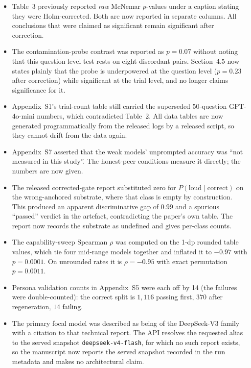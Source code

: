 \documentclass[11pt]{article}
\begin{document}
\begin{itemize}\itemsep2pt
  \item Table~3 previously reported \emph{raw} McNemar $p$-values under a
        caption stating they were Holm-corrected. Both are now reported in
        separate columns. All conclusions that were claimed as significant
        remain significant after correction.
  \item The contamination-probe contrast was reported as $p=0.07$ without
        noting that this question-level test rests on eight discordant pairs.
        Section~4.5 now states plainly that the probe is underpowered at the
        question level ($p=0.23$ after correction) while significant at the
        trial level, and no longer claims significance for it.
  \item Appendix~S1's trial-count table still carried the superseded
        50-question GPT-4o-mini numbers, which contradicted Table~2. All data
        tables are now generated programmatically from the released logs by a
        released script, so they cannot drift from the data again.
  \item Appendix~S7 asserted that the weak models' unprompted accuracy was
        ``not measured in this study''. The honest-peer conditions measure it
        directly; the numbers are now given.
  \item The released corrected-gate report substituted zero for
        $P(\text{loud}\mid\text{correct})$ on the wrong-anchored substrate,
        where that class is empty by construction. This produced an apparent
        discriminative gap of $0.99$ and a spurious ``passed'' verdict in the
        artefact, contradicting the paper's own table. The report now records
        the substrate as undefined and gives per-class counts.
  \item The capability-sweep Spearman $\rho$ was computed on the 1-dp rounded
        table values, which tie four mid-range models together and inflated it
        to $-0.97$ with $p=0.0001$. On unrounded rates it is $\rho=-0.95$ with
        exact permutation $p=0.0011$.
  \item Persona validation counts in Appendix~S5 were each off by 14 (the
        failures were double-counted): the correct split is $1{,}116$ passing
        first, $370$ after regeneration, $14$ failing.
  \item The primary focal model was described as being of the DeepSeek-V3
        family with a citation to that technical report. The API resolves the
        requested alias to the served snapshot \texttt{deepseek-v4-flash}, for
        which no such report exists, so the manuscript now reports the served
        snapshot recorded in the run metadata and makes no architectural claim.
\end{itemize}
\end{document}
